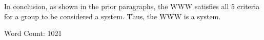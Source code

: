 \documentclass[11pt]{article}
\begin{document}
\par In conclusion, as shown in the prior paragraphs, the WWW satisfies all 5 criteria for a group to be considered a system. Thus, the WWW is a system.
\par
\par Word Count: 1021

















	





	








\end{document}
